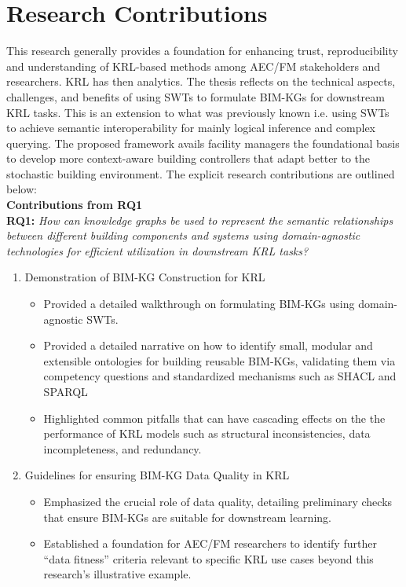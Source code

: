 \section{Research Contributions}
This research generally provides a foundation for enhancing trust, reproducibility and understanding of \ac{KRL}-based methods
among AEC/FM stakeholders and researchers. \ac{KRL} has then analytics. The thesis reflects on the technical aspects, challenges, and benefits of using \acp{SWT} to formulate \acp{BIM-KG} for downstream \ac{KRL} tasks. This is an extension to what was previously known i.e. using \acp{SWT} to achieve semantic interoperability for mainly logical inference and complex querying. The proposed framework avails facility managers the foundational basis to develop more context-aware building controllers that adapt better to the stochastic building environment. The explicit research contributions are outlined below:\\

\noindent \textbf{Contributions from RQ1}\\
\noindent \textbf{RQ1:} \textit{How can knowledge graphs be used to represent the semantic relationships between different building components and systems using domain-agnostic technologies for efficient utilization in downstream KRL tasks?}
\begin{enumerate}
\item 
Demonstration of \ac{BIM-KG} Construction for \ac{KRL}
    \begin{itemize}
    \item 
    Provided a detailed walkthrough on formulating \acp{BIM-KG} using domain-agnostic \acp{SWT}.

    \item 
    Provided a detailed narrative on how to identify small, modular and extensible ontologies for building reusable \acp{BIM-KG}, validating them via competency questions and standardized mechanisms such as \ac{SHACL} and \ac{SPARQL}

    \item 
    Highlighted common pitfalls that can have cascading effects on the the performance of \ac{KRL} models such as structural inconsistencies, data incompleteness, and redundancy.
    \end{itemize}

\item 
Guidelines for ensuring \ac{BIM-KG} Data Quality in \ac{KRL}
    \begin{itemize}
    \item 
    Emphasized the crucial role of data quality, detailing preliminary checks that ensure BIM-KGs are suitable for downstream learning.

    \item 
    Established a foundation for \ac{AEC/FM} researchers to identify further “data fitness” criteria relevant to specific \ac{KRL} use cases beyond this research's illustrative example.
    \end{itemize}  
\end{enumerate}



